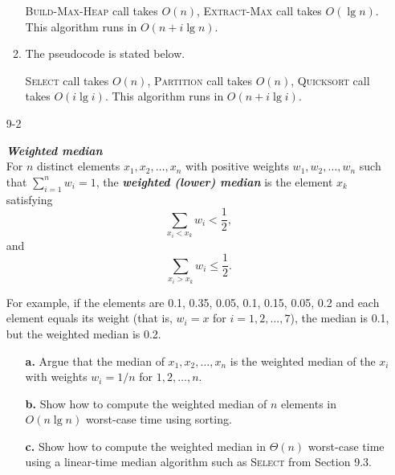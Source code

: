 \begin{enumerate}
\begin{framed}
\begin{enumerate}
\textsc{Build-Max-Heap} call takes $O(n)$, \textsc{Extract-Max} call takes
$O(\lg n)$. This algorithm runs in $O(n + i \lg n)$.

\item The pseudocode is stated below.

\begin{algorithm}[H]
\SetAlgoNoEnd\DontPrintSemicolon
\BlankLine
{}
\nonl{}
\end{algorithm}

\textsc{Select} call takes $O(n)$, \textsc{Partition} call takes $O(n)$,
\textsc{Quicksort} call takes $O(i \lg i)$. This algorithm runs in $O(n + i \lg i)$.
\end{enumerate}
\end{framed}

\newpage

\item[9-2]{\textbf{\emph{Weighted median}}\\
For $n$ distinct elements $x_1, x_2, \dots, x_n$ with positive weights
$w_1, w_2, \dots, w_n$ such that $\sum_{i = 1}^{n} w_i = 1$, the
\textbf{\emph{weighted (lower) median}} is the element $x_k$ satisfying
\[
  \sum_{x_i < x_k} w_i < \frac{1}{2},
\]
and
\[
  \sum_{x_i > x_k} w_i \le \frac{1}{2}.
\]

For example, if the elements are 0.1, 0.35, 0.05, 0.1, 0.15, 0.05, 0.2 and each
element equals its weight (that is, $w_i = x$ for $i = 1, 2, \dots, 7$), the
median is 0.1, but the weighted median is 0.2.

\begin{enumerate}
\item[\textbf{a.}] Argue that the median of $x_1, x_2, \dots, x_n$ is the
weighted median of the $x_i$ with weights $w_i = 1/n$ for $1, 2, \dots, n$.
\item[\textbf{b.}] Show how to compute the weighted median of $n$ elements in
$O(n \lg n)$ worst-case time using sorting.
\item[\textbf{c.}] Show how to compute the weighted median in $\Theta(n)$
worst-case time using a linear-time median algorithm such as \textsc{Select}
from Section 9.3.
\end{enumerate}

}
\end{enumerate}
